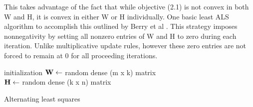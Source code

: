 \documentclass[final,leqno,onefignum,onetabnum]{siamltex1213}
\begin{document}
This takes advantage of the fact that while objective (2.1) is not convex in both W and H, it is convex in either W or H individually. One basic least ALS algorithm to accomplish this outlined by Berry et al \cite{Ber}. This strategy imposes nonnegativity by setting all nonzero entries of W and H to zero during each iteration. Unlike multiplicative update rules, however these zero entries are not forced to remain at 0 for all proceeding iterations. \\

\begin{algorithm}[H]	

 initialization\;
$\bf{W} \gets $ random dense (m x k) matrix\\
$\bf{H} \gets $ random dense (k x n) matrix\\
 \caption{Alternating least squares}
\end{algorithm} 
\end{document}

